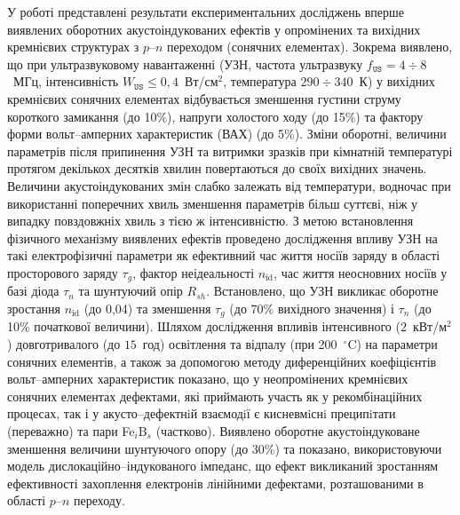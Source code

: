 У  роботі представлені результати експериментальних досліджень вперше виявлених оборотних акустоіндукованих ефектів у опромінених та вихідних кремнієвих структурах з  $p$--$n$ переходом (сонячних елементах).
Зокрема виявлено, що при ультразвуковому навантаженні (УЗН, частота ультразвуку $f_\mathtt{US}=4\div8$~МГц, інтенсивність $W_\mathtt{US}\leq0,4$~Вт/см$^2$, температура $290\div340$~К) у вихідних кремнієвих сонячних елементах  відбувається  зменшення густини струму короткого замикання (до 10\%), напруги холостого ходу  (до 15\%) та фактору форми вольт--амперних характеристик (ВАХ) (до 5\%).
Зміни оборотні, величини параметрів  після припинення УЗН  та витримки зразків при кімнатній температурі протягом декількох десятків хвилин повертаються до своїх вихідних значень.
Величини акустоіндукованих змін слабко залежать від температури, водночас при використанні поперечних хвиль зменшення параметрів більш суттєві, ніж у випадку повздовжніх хвиль з тією ж інтенсивністю.
З метою встановлення фізичного механізму виявлених ефектів проведено дослідження впливу УЗН на такі електрофізичні параметри як
ефективний час життя носіїв заряду в області просторового заряду $\tau_{g}$,
фактор неідеальності $n_\mathrm{id}$,
час життя неосновних носіїв у базі діода $\tau_n$
та шунтуючий опір $R_{sh}$.
Встановлено, що УЗН викликає оборотне зростання $n_\mathrm{id}$  (до 0,04) та зменшення $\tau_g$ (до 70\% вихідного значення) і
$\tau_n$ (до 10\% початкової величини).
Шляхом дослідження  впливів інтенсивного ($2$~кВт/м$^2$) довготривалого (до  $15$~год) освітлення
та відпалу (при 200~$^\circ$C) на параметри сонячних елементів,
а також за допомогою
методу диференційних коефіцієнтів вольт--амперних характеристик показано, що
у неопромінених кремнієвих сонячних елементах
дефектами, які приймають участь як у рекомбінаційних процесах, так і у акусто--дефектнiй взаємодiї є кисневмiснi преципiтати (переважно) та
пари Fe$_i$B$_s$ (частково).
Виявлено оборотне акустоіндуковане зменшення величини шунтуючого опору (до 30\%) та показано,
використовуючи модель дислокаційно--індукованого імпеданс, що ефект викликаний зростанням ефективності захоплення електронів лінійними дефектами, розташованими в області $p$--$n$ переходу.


